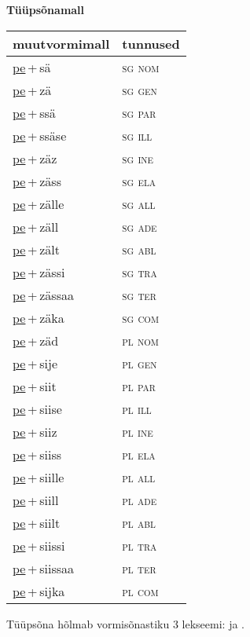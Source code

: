 
\vspace{1.8em}
\begin{minipage}{\textwidth}
\textbf{Tüüpsõnamall \,}\\

\begin{sideways}
\begin{tabular}{l l}
muutvormimall & tunnused \\
\hline
\underline{pe}\,+\,sä & \textsc{ sg nom } \\
\underline{pe}\,+\,zä & \textsc{ sg gen } \\
\underline{pe}\,+\,ssä & \textsc{ sg par } \\
\underline{pe}\,+\,ssäse & \textsc{ sg ill } \\
\underline{pe}\,+\,zäz & \textsc{ sg ine } \\
\underline{pe}\,+\,zäss & \textsc{ sg ela } \\
\underline{pe}\,+\,zälle & \textsc{ sg all } \\
\underline{pe}\,+\,zäll & \textsc{ sg ade } \\
\underline{pe}\,+\,zält & \textsc{ sg abl } \\
\underline{pe}\,+\,zässi & \textsc{ sg tra } \\
\underline{pe}\,+\,zässaa & \textsc{ sg ter } \\
\underline{pe}\,+\,zäka & \textsc{ sg com } \\
\underline{pe}\,+\,zäd & \textsc{ pl nom } \\
\underline{pe}\,+\,sije & \textsc{ pl gen } \\
\underline{pe}\,+\,siit & \textsc{ pl par } \\
\underline{pe}\,+\,siise & \textsc{ pl ill } \\
\underline{pe}\,+\,siiz & \textsc{ pl ine } \\
\underline{pe}\,+\,siiss & \textsc{ pl ela } \\
\underline{pe}\,+\,siille & \textsc{ pl all } \\
\underline{pe}\,+\,siill & \textsc{ pl ade } \\
\underline{pe}\,+\,siilt & \textsc{ pl abl } \\
\underline{pe}\,+\,siissi & \textsc{ pl tra } \\
\underline{pe}\,+\,siissaa & \textsc{ pl ter } \\
\underline{pe}\,+\,sijka & \textsc{ pl com } \\
\end{tabular}
\end{sideways}
\label{tab:tüüpsõnamall-pesä}

\end{minipage}

 
\vspace{1em}
\noindent Tüüpsõna hõlmab vormisõnastiku 3 lekseemi:  ja .
